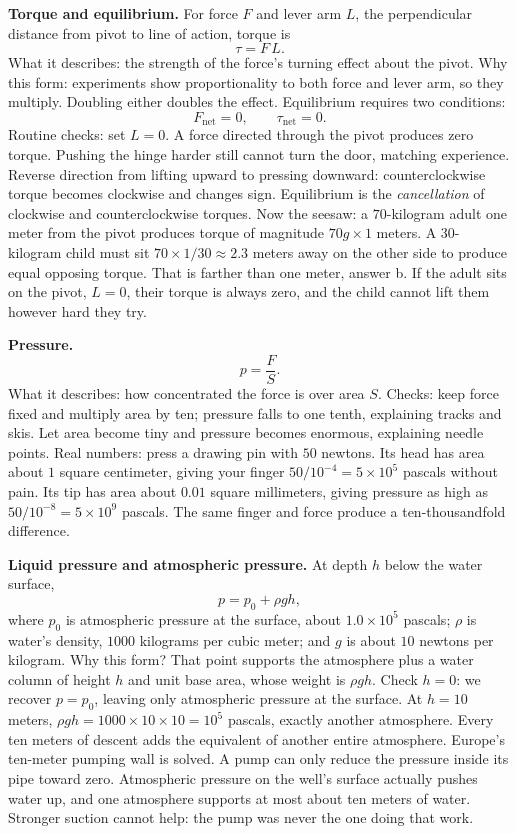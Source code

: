 \begin{mainline}
\textbf{Torque and equilibrium.} For force \(F\) and lever arm \(L\), the perpendicular distance from pivot to line of action, torque is
\[
  \tau = F\,L .
\]
What it describes: the strength of the force's turning effect about the pivot. Why this form: experiments show proportionality to both force and lever arm, so they multiply. Doubling either doubles the effect. Equilibrium requires two conditions:
\[
  F_{\text{net}} = 0, \qquad \tau_{\text{net}} = 0 .
\]
Routine checks: set \(L=0\). A force directed through the pivot produces zero torque. Pushing the hinge harder still cannot turn the door, matching experience. Reverse direction from lifting upward to pressing downward: counterclockwise torque becomes clockwise and changes sign. Equilibrium is the \emph{cancellation} of clockwise and counterclockwise torques. Now the seesaw: a \(70\)-kilogram adult one meter from the pivot produces torque of magnitude \(70g\times 1\) meters. A \(30\)-kilogram child must sit \(70\times 1/30\approx 2.3\) meters away on the other side to produce equal opposing torque. That is farther than one meter, answer b. If the adult sits on the pivot, \(L=0\), their torque is always zero, and the child cannot lift them however hard they try.

\textbf{Pressure.}
\[
  p = \frac{F}{S} .
\]
What it describes: how concentrated the force is over area \(S\). Checks: keep force fixed and multiply area by ten; pressure falls to one tenth, explaining tracks and skis. Let area become tiny and pressure becomes enormous, explaining needle points. Real numbers: press a drawing pin with \(50\) newtons. Its head has area about \(1\) square centimeter, giving your finger \(50/10^{-4}=5\times10^{5}\) pascals without pain. Its tip has area about \(0.01\) square millimeters, giving pressure as high as \(50/10^{-8}=5\times10^{9}\) pascals. The same finger and force produce a ten-thousandfold difference.

\textbf{Liquid pressure and atmospheric pressure.} At depth \(h\) below the water surface,
\[
  p = p_{0} + \rho g h,
\]
where \(p_{0}\) is atmospheric pressure at the surface, about \(1.0\times10^{5}\) pascals; \(\rho\) is water's density, \(1000\) kilograms per cubic meter; and \(g\) is about \(10\) newtons per kilogram. Why this form? That point supports the atmosphere plus a water column of height \(h\) and unit base area, whose weight is \(\rho g h\). Check \(h=0\): we recover \(p=p_{0}\), leaving only atmospheric pressure at the surface. At \(h=10\) meters, \(\rho g h=1000\times10\times10=10^{5}\) pascals, exactly another atmosphere. Every ten meters of descent adds the equivalent of another entire atmosphere. Europe's ten-meter pumping wall is solved. A pump can only reduce the pressure inside its pipe toward zero. Atmospheric pressure on the well's surface actually pushes water up, and one atmosphere supports at most about ten meters of water. Stronger suction cannot help: the pump was never the one doing that work.


\end{mainline}
